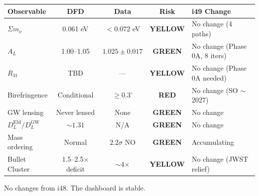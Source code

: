 \documentclass[11pt,a4paper]{article}
\newcommand{\GREEN}{\textcolor{dfdgreen}{\textbf{GREEN}}}
\newcommand{\YELLOW}{\textcolor{dfdyellow}{\textbf{YELLOW}}}
\newcommand{\RED}{\textcolor{dfdred}{\textbf{RED}}}
\begin{document}
\begin{center}
\begin{longtable}{lcccl}
\toprule
\textbf{Observable} & \textbf{DFD} & \textbf{Data} & \textbf{Risk} & \textbf{i49 Change} \\
\midrule
\endfirsthead
$\Sigma m_\nu$ & 0.061 eV & $< 0.072$ eV & \YELLOW & No change (4 paths) \\
$A_L$ & 1.00--1.05 & $1.025 \pm 0.017$ & \GREEN & No change (Phase 0A, 8 iters) \\
$R_{31}$ & TBD & --- & \YELLOW & No change (Phase 0A needed) \\
Birefringence & Conditional & $\geq 0.3^\circ$ & \RED & No change (SO $\sim$2027) \\
GW lensing & Never lensed & None & \GREEN & No change \\
$D_L^{\text{EM}}/D_L^{\text{GW}}$ & $\sim 1.31$ & N/A & \GREEN & No change \\
Mass ordering & Normal & $2.2\sigma$ NO & \GREEN & Accumulating \\
Bullet Cluster & 1.5--2.5$\times$ deficit & $\sim$4$\times$ & \YELLOW & No change (JWST relief) \\
\bottomrule
\end{longtable}
\end{center}

No changes from i48. The dashboard is stable.
\end{document}
